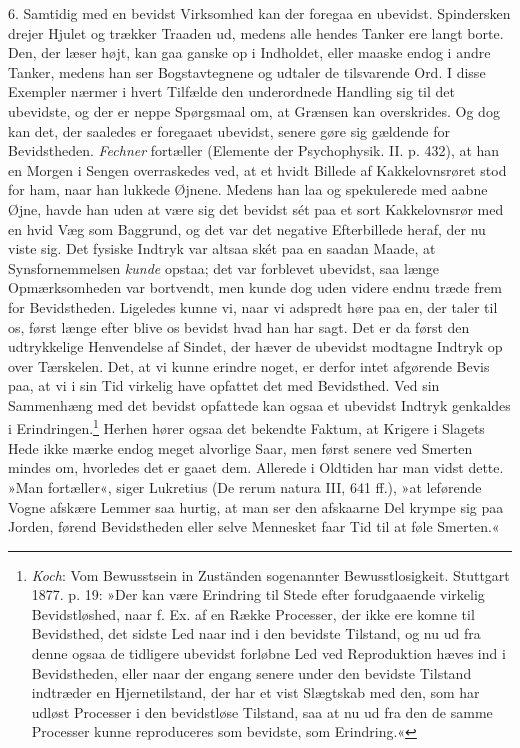 \documentclass[12pt,a4paper,openany]{book}
\newcommand{\opage}[1]{\marginnote{\footnotesize\textit{[#1]}}}
\begin{document}
6. Samtidig med en bevidst Virksomhed kan der foregaa en ubevidst.
Spindersken drejer Hjulet og trækker Traaden ud, medens alle hendes
Tanker ere langt borte. Den, der læser højt, kan gaa ganske op i
Indholdet, eller maaske endog i andre Tanker, medens han ser
Bogstavtegnene og udtaler de tilsvarende Ord. I disse Exempler nærmer i
hvert Tilfælde den underordnede Handling sig til det ubevidste, og der
er neppe Spørgsmaal om, at Grænsen kan overskrides. Og dog kan det, der
saaledes er foregaaet ubevidst, senere gøre sig gældende for
Bevidstheden. \emph{Fechner} fortæller (Elemente der Psychophysik. II.
p. 432), at han en Morgen i Sengen overraskedes ved, at et hvidt Billede
af Kakkelovnsrøret stod for ham, naar han lukkede Øjnene. Medens han laa
og spekulerede med aabne Øjne, havde han uden at være sig det bevidst
sét paa et sort Kakkelovnsrør med en hvid Væg som Baggrund, og det var
det negative Efterbillede heraf, der nu viste sig. Det fysiske Indtryk
var altsaa skét paa en saadan Maade, at Synsfornemmelsen \emph{kunde}
opstaa; det var forblevet ubevidst, saa længe Opmærksomheden var
bortvendt, men kunde dog uden videre endnu træde frem for Bevidstheden.
Ligeledes kunne vi, naar vi adspredt høre paa en, der taler til os,
først længe efter blive os bevidst hvad han har sagt. Det er da først
den udtrykkelige Henvendelse af Sindet, der hæver de ubevidst modtagne
Indtryk op over Tærskelen. Det, at vi kunne erindre noget, er derfor
intet afgørende Bevis paa, at vi i sin Tid virkelig have opfattet det
med Bevidsthed. Ved sin Sammenhæng med det bevidst opfattede kan ogsaa
et ubevidst Indtryk genkaldes i Erindringen.\footnote[1]{\emph{Koch}:
Vom Bewusstsein in Zuständen sogenannter Bewusstlosigkeit. Stuttgart
1877. p. 19: »Der kan være Erindring til Stede efter forudgaaende
virkelig Bevidstløshed, naar f. Ex. af en Række Processer, der ikke ere
komne til Bevidsthed, det sidste Led naar ind i den bevidste Tilstand,
og nu ud fra denne ogsaa de tidligere ubevidst forløbne Led ved
Reproduktion hæves ind i Bevidstheden, eller naar der engang senere
under den bevidste Tilstand indtræder en Hjernetilstand, der har et vist
Slægtskab med den, som har udløst Processer i den bevidstløse Tilstand,
saa at nu ud fra den de samme Processer kunne reproduceres som bevidste,
som Erindring.«} Herhen hører ogsaa det bekendte
\opage{92}Faktum, at Krigere i Slagets Hede ikke mærke endog meget
alvorlige Saar, men først senere ved Smerten mindes om, hvorledes det er
gaaet dem. Allerede i Oldtiden har man vidst dette. »Man fortæller«,
siger Lukretius (De rerum natura III, 641 ff.), »at leførende Vogne
afskære Lemmer saa hurtig, at man ser den afskaarne Del krympe sig paa
Jorden, førend Bevidstheden eller selve Mennesket faar Tid til at føle
Smerten.«
\end{document}
